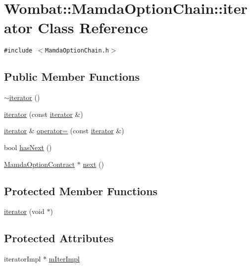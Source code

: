 \hypertarget{classWombat_1_1MamdaOptionChain_1_1iterator}{
\section{Wombat::Mamda\-Option\-Chain::iterator Class Reference}
\label{classWombat_1_1MamdaOptionChain_1_1iterator}
}
{\tt \#include $<$Mamda\-Option\-Chain.h$>$}

\subsection*{Public Member Functions}
\begin{CompactItemize}
\item 
\hyperlink{classWombat_1_1MamdaOptionChain_1_1iterator_6680e6a1d4d4cec1f04aa091ee88741f}{$\sim$iterator} ()
\item 
\hyperlink{classWombat_1_1MamdaOptionChain_1_1iterator_872f44b02dc42292997f39760ea017e8}{iterator} (const \hyperlink{classWombat_1_1MamdaOptionChain_1_1iterator}{iterator} \&)
\item 
\hyperlink{classWombat_1_1MamdaOptionChain_1_1iterator}{iterator} \& \hyperlink{classWombat_1_1MamdaOptionChain_1_1iterator_ff4ee79899630cdb20018924bd01a2af}{operator=} (const \hyperlink{classWombat_1_1MamdaOptionChain_1_1iterator}{iterator} \&)
\item 
bool \hyperlink{classWombat_1_1MamdaOptionChain_1_1iterator_2b7d07e58b4f3b0134d57483388f106c}{has\-Next} ()
\item 
\hyperlink{classWombat_1_1MamdaOptionContract}{Mamda\-Option\-Contract} $\ast$ \hyperlink{classWombat_1_1MamdaOptionChain_1_1iterator_ca4efaeb0cd56b2ec22bcc8288e78a81}{next} ()
\end{CompactItemize}
\subsection*{Protected Member Functions}
\begin{CompactItemize}
\item 
\hyperlink{classWombat_1_1MamdaOptionChain_1_1iterator_acb9b6f73ea9a47cc6b01d9b19b833b4}{iterator} (void $\ast$)
\end{CompactItemize}
\subsection*{Protected Attributes}
\begin{CompactItemize}
\item 
iterator\-Impl $\ast$ \hyperlink{classWombat_1_1MamdaOptionChain_1_1iterator_d19a66c70e409ba08eccbf18c119ba9c}{m\-Iter\-Impl}
\end{CompactItemize}
